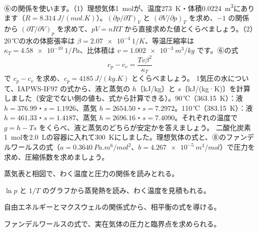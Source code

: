 \bkproblem ⑥の関係を使います。（1）理想気体\qty{1}{mol}が、温度\qty{273}{K}・体積\qty{0.0224}{m^3}にあります（$R=\qty{8.314}{J/(mol.K)}$）。$(\partial p/\partial T)_V$ と $(\partial V/\partial p)_T$ を求め、$-1$ の関係から $(\partial T/\partial V)_p$ を求めて、$pV=nRT$ から直接求めた値とくらべましょう。（2）20\,℃の水の体膨張率は $\beta=\qty{2.07e-4}{1/K}$、等温圧縮率は $\kappa_T=\qty{4.58e-10}{1/Pa}$、比体積は $v=\qty{1.002e-3}{m^3/kg}$ です。⑥の式
\[c_p-c_v=\frac{Tv\beta^2}{\kappa_T}\]
で $c_p-c_v$ を求め、$c_p=\qty{4185}{J/(kg.K)}$ とくらべましょう。
\bkproblem 1気圧の水について、IAPWS-IF97 の式から、液と蒸気の $h$〔kJ/kg〕と $s$〔kJ/(kg·K)〕を計算しました（安定でない側の値も、式から計算できる）。90\,℃（\qty{363.15}{K}）：液 $h=376.99$・$s=1.1926$、蒸気 $h=2654.50$・$s=7.2972$。110\,℃（\qty{383.15}{K}）：液 $h=461.33$・$s=1.4187$、蒸気 $h=2696.16$・$s=7.4090$。それぞれの温度で $g=h-Ts$ をくらべ、液と蒸気のどちらが安定かを答えましょう。
\bkproblem 二酸化炭素\qty{1}{mol}を\qty{2.0}{L}の容器に入れて\qty{300}{K}にしました。理想気体の式と、⑧のファンデルワールスの式（$a=\qty{0.3640}{Pa.m^6/mol^2}$、$b=\qty{4.267e-5}{m^3/mol}$）で圧力を求め、圧縮係数を求めましょう。

\begin{furikaeri}
\begin{checklist}
\item 蒸気表と相図で、わく温度と圧力の関係を読みとれる。
\item $\ln p$ と $1/T$ のグラフから蒸発熱を読み、わく温度を見積もれる。
\item 自由エネルギーとマクスウェルの関係式から、相平衡の式を導ける。
\item ファンデルワールスの式で、実在気体の圧力と臨界点を求められる。
\end{checklist}
\end{furikaeri}
